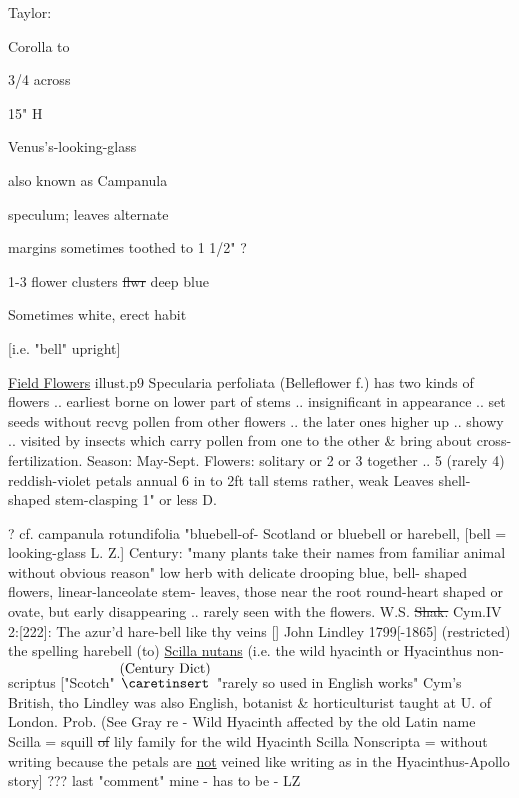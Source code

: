 \documentclass[a4paper]{article}
\begin{document}
\begin{minipage}[t]{0.6\textwidth}
\begin{minipage}[t]{0.3\textwidth}
\begin{flushright}
    Taylor:\par
\end{flushright}
\vspace{5pt}
\small
Corolla to\par
3/4 across\par
15" H\par
\normalfont
\end{minipage}
\begin{minipage}[t]{0.6\textwidth}
Venus's-looking-glass\par
also known as Campanula\par
speculum; leaves alternate\par
margins sometimes toothed to 1 1/2" ?\par
1-3 flower clusters \sout{flwr} deep blue\par
Sometimes white, erect habit\par
{[i.e. "bell" upright]}\par
\end{minipage}
\begin{minipage}[t]{0.9\textwidth}
\ul{Field Flowers} illust.p9 Specularia
perfoliata (Belleflower
f.)
has two kinds of flowers .. earliest
borne on lower part of stems .. insignificant
in appearance .. set seeds without recvg
pollen from other flowers .. the later ones
higher up .. showy .. visited by insects
which carry pollen from one to the other \& bring
about cross-fertilization. Season:
May-Sept. Flowers: solitary or 2 or 3
together .. 5 (rarely 4) reddish-violet petals
annual 6 in to 2ft tall stems rather,
weak Leaves shell-shaped stem-clasping
1" or less D.\par 
\color{red}
? cf. campanula rotundifolia "bluebell-of-
Scotland or bluebell or harebell,
[bell = looking-glass L. Z.] Century:
"many plants take their names from
familiar animal %
without obvious reason"
low herb with delicate drooping blue, bell-
shaped flowers, linear-lanceolate stem-
leaves, those near the root round-heart
shaped or ovate, but early disappearing
.. rarely seen with the flowers.
W.S. \sout{Shak.} Cym.IV 2:[222]: The azur'd hare-bell
like thy veins [] John Lindley 1799[-1865]
(restricted) the spelling harebell
(to) \ul{Scilla nutans} (i.e. the wild
hyacinth or Hyacinthus non-scriptus
["Scotch" 
\color{blue}
$\stackrel{\hbox{(Century Dict)}}{\hbox{$\caretinsert$}}$
\color{red}
"rarely so used in English
works" Cym's British, tho Lindley 
was also English, botanist \& horticulturist
taught at U. of London. Prob. (See
Gray re - Wild Hyacinth affected
by the old Latin name Scilla = squill
\sout{of} lily family for the wild Hyacinth
Scilla Nonscripta = without writing
because the petals are \ul{not} veined like
writing as in the Hyacinthus-Apollo story]
\color{blue}
??? last "comment" mine
- has to be - LZ
\end{minipage}
\end{minipage}
\end{document}
